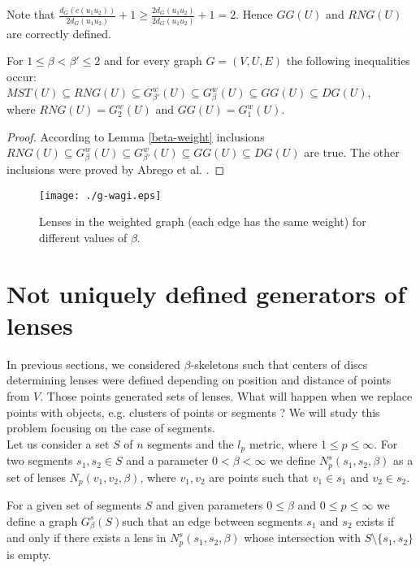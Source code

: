 \documentclass[11pt]{llncs}
\begin{document}
Note that $\frac{d_G(c(u_1u_2))}{2d_G(u_1u_2)}+1 \geq \frac{2d_G(u_1u_2)}{2d_G(u_1u_2)}+1=2$.
Hence $GG(U)$ and $RNG(U)$ are correctly defined.

\begin{lemma}
For $1 \leq \beta < \beta' \leq 2$ and for every graph $G=(V,U,E)$ the following inequalities occur: \\
$MST(U) \subseteq RNG(U) \subseteq G_{\beta'}^w{(U)} \subseteq G_{\beta}^w{(U)} \subseteq GG(U) \subseteq DG(U)$, \\
where $RNG(U)=G_{2}^w{(U)}$ and $GG(U)=G_1^w{(U)}$.
\end{lemma}
\begin{proof}
According to Lemma \ref{beta-weight} inclusions 
$RNG(U) \subseteq G_{\beta}^w{(U)} \subseteq G_{\beta'}^w{(U)} \subseteq GG(U) \subseteq DG(U)$
are true. The other inclusions were proved by Abrego et al. \cite{a12}. 
\end{proof}

\begin{figure}[htbp]
\centering
\texttt{[image: ./g-wagi.eps]}
\caption{Lenses in the weighted graph (each edge has the same weight) for different
values of $\beta$.}
\label{fig:weighted}
\end{figure}


\section{Not uniquely defined generators of lenses} 

In previous sections, we considered $\beta$-skeletons such that centers of discs determining lenses
were defined depending on position and distance of points from $V$. Those points generated sets
of lenses. What will happen when we replace points with objects, e.g. clusters of points or segments ?
We will study this problem focusing on the case of segments. \\ 

Let us consider a set $S$ of $n$ segments and the $l_p$ metric, where $1 \leq p \leq \infty$.
For two segments $s_1,s_2 \in S$ and a parameter $0<\beta<\infty$ we define $N_p^s(s_1,s_2,\beta)$
as a set of lenses $N_p(v_1,v_2,\beta)$, where $v_1,v_2$ are points such that $v_1 \in s_1$ 
and $v_2 \in s_2$. 

\begin{definition}
\label{betaskeleton3}
For a given set of segments $S$ and given parameters $0 \leq \beta$ and $0 \leq p \leq \infty$ 
we define a graph $G_{\beta}^s(S)$such that an edge between segments $s_1$ and $s_2$ exists 
if and only if there exists a lens in $N_p^s(s_1, s_2,\beta)$ whose intersection
with $S \setminus \{s_1,s_2\}$ is empty. 
\end{definition}
\end{document}
